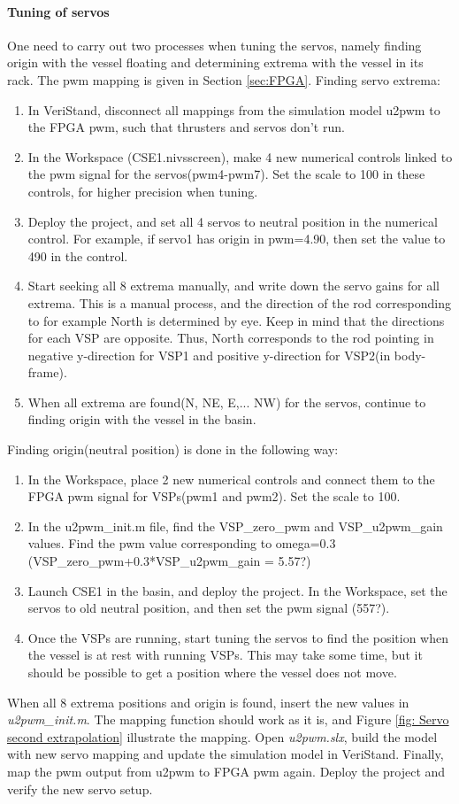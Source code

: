 \paragraph{Tuning of servos}
One need to carry out two processes when tuning the servos, namely finding origin with the vessel floating and determining extrema with the vessel in its rack. The pwm mapping is given in Section \ref{sec:FPGA}. Finding servo extrema:
\begin{enumerate}
	\item In VeriStand, disconnect all mappings from the simulation model u2pwm to the FPGA pwm, such that thrusters and servos don't run. 
	\item In the Workspace (CSE1.nivsscreen), make 4 new numerical controls linked to the pwm signal for the servos(pwm4-pwm7). Set the scale to 100 in these controls, for higher precision when tuning. 
	\item Deploy the project, and set all 4 servos to neutral position in the numerical control. For example, if servo1 has origin in pwm=4.90, then set the value to 490 in the control. 
	\item Start seeking all 8 extrema manually, and write down the servo gains for all extrema. This is a manual process, and the direction of the rod corresponding to for example North is determined by eye. Keep in mind that the directions for each VSP are opposite. Thus, North corresponds to the rod pointing in negative y-direction for VSP1 and positive y-direction for VSP2(in body-frame). 
	\item When all extrema are found(N, NE, E,... NW) for the servos, continue to finding origin with the vessel in the basin. 
\end{enumerate}
Finding origin(neutral position) is done in the following way: 
\begin{enumerate}
	\item In the Workspace, place 2 new numerical controls and connect them to the FPGA pwm signal for VSPs(pwm1 and pwm2). Set the scale to 100. 
	\item In the u2pwm\_init.m file, find the VSP\_zero\_pwm and VSP\_u2pwm\_gain values. Find the pwm value corresponding to omega=0.3 (VSP\_zero\_pwm+0.3*VSP\_u2pwm\_gain = 5.57?)
	\item Launch CSE1 in the basin, and deploy the project. In the Workspace, set the servos to old neutral position, and then set the pwm signal (557?). 
	\item Once the VSPs are running, start tuning the servos to find the position when the vessel is at rest with running VSPs. This may take some time, but it should be possible to get a position where the vessel does not move. 
\end{enumerate}
When all 8 extrema positions and origin is found, insert the new values in \textit{u2pwm\_init.m}. The mapping function should work as it is, and Figure \ref{fig: Servo second extrapolation} illustrate the mapping. Open \textit{u2pwm.slx}, build the model with new servo mapping and update the simulation model in VeriStand. Finally, map the pwm output from u2pwm to FPGA pwm again. Deploy the project and verify the new servo setup. 
